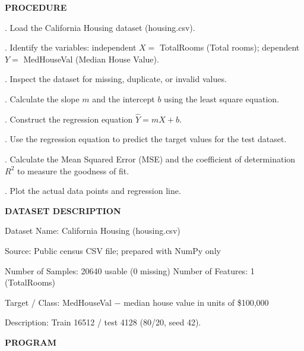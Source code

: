 \documentclass[11pt,twoside]{article}
\newcommand{\expheading}[1]{{\fontsize{14}{17}\selectfont\textbf{#1}\par}}
\newcommand{\toevenpage}{\clearpage\ifodd\value{page}\null\thispagestyle{empty}\newpage\fi}
\begin{document}
{\expheading{PROCEDURE}
\vspace{4pt}
. Load the California Housing dataset (housing.csv).\par
{}. Identify the variables: independent $X=$ TotalRooms (Total rooms); dependent $Y=$ MedHouseVal (Median House Value).\par
{}. Inspect the dataset for missing, duplicate, or invalid values.\par
{}. Calculate the slope $m$ and the intercept $b$ using the least square equation.\par
{}. Construct the regression equation $\hat{Y}=mX+b$.\par
{}. Use the regression equation to predict the target values for the test dataset.\par
{}. Calculate the Mean Squared Error (MSE) and the coefficient of determination $R^2$ to measure the goodness of fit.\par
{}. Plot the actual data points and regression line. \par
\vspace{4pt}

\expheading{DATASET DESCRIPTION}
\vspace{4pt}
\noindent Dataset Name: California Housing (housing.csv)\par
\noindent Source: Public census CSV file; prepared with NumPy only\par
\noindent Number of Samples: 20640 usable (0 missing) \hspace{0.3cm} Number of Features: 1 (TotalRooms)\par
\noindent Target / Class: MedHouseVal $-$ median house value in units of \$100{,}000\par
\noindent Description: Train 16512 / test 4128 (80/20, seed 42). \par
\vspace{4pt}
} %
\toevenpage
\expheading{PROGRAM}
\vspace{6pt}
\end{document}
